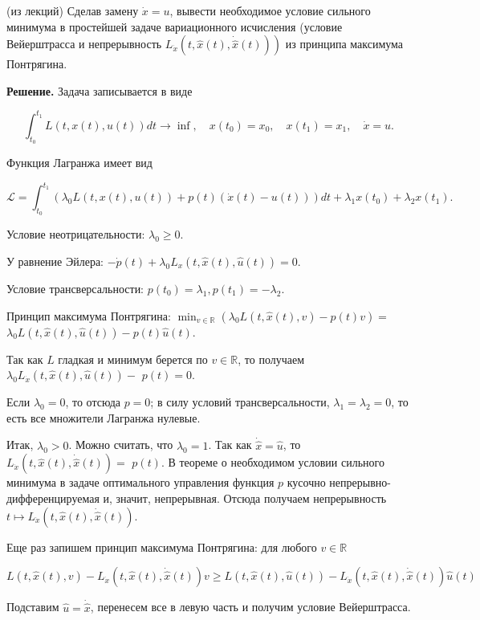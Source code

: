 \begin{task} 
    (из лекций) Сделав замену $\dot{x}=u$, вывести необходимое условие сильного минимума в простейшей задаче 
    вариационного исчисления 
    (условие Вейерштрасса и непрерывность $\left.L_{\dot{x}}(t, \hat{x}(t), \dot{\hat{x}}(t))\right)$ из принципа максимума Понтрягина.

    \textbf{Решение.} Задача записывается в виде
    
    $$
    \int_{t_{0}}^{t_{1}} L(t, x(t), u(t)) d t \rightarrow \inf , \quad x\left(t_{0}\right)=x_{0}, \quad x\left(t_{1}\right)=x_{1}, \quad \dot{x}=u .
    $$
    
    Функция Лагранжа имеет вид
    
    $$
    \mathcal{L}=\int_{t_{0}}^{t_{1}}\left(\lambda_{0} L(t, x(t), u(t))+p(t)(\dot{x}(t)-u(t))\right) d t+\lambda_{1} x\left(t_{0}\right)+\lambda_{2} x\left(t_{1}\right) .
    $$
    
    Условие неотрицательности: $\lambda_{0} \geq 0$.
    
    У равнение Эйлера: $-\dot{p}(t)+\lambda_{0} L_{x}(t, \hat{x}(t), \hat{u}(t))=0$.
    
    Условие трансверсальности: $p\left(t_{0}\right)=\lambda_{1}, p\left(t_{1}\right)=-\lambda_{2}$.
    
    Принцип максимума Понтрягина: $\min _{v \in \mathbb{R}}\left(\lambda_{0} L(t, \hat{x}(t), v)-p(t) v\right)=$ $\lambda_{0} L(t, \hat{x}(t), \hat{u}(t))-p(t) \hat{u}(t)$.
    
    Так как $L$ гладкая и минимум берется по $v \in \mathbb{R}$, то получаем $\lambda_{0} L_{\dot{x}}(t, \hat{x}(t), \hat{u}(t))-$ $p(t)=0$.
    
    Если $\lambda_{0}=0$, то отсюда $p=0$; в силу условий трансверсальности, $\lambda_{1}=\lambda_{2}=0$, то есть все множители Лагранжа нулевые.
    
    Итак, $\lambda_{0}>0$. Можно считать, что $\lambda_{0}=1$. Так как $\dot{\hat{x}}=\hat{u}$, то $L_{\dot{x}}(t, \hat{x}(t), \dot{\hat{x}}(t))=$ $p(t)$. В теореме о необходимом условии сильного минимума в задаче оптимального управления функция $p$ кусочно непрерывно-дифференцируемая и, значит, непрерывная. Отсюда получаем непрерывность $t \mapsto L_{\dot{x}}(t, \hat{x}(t), \dot{\hat{x}}(t))$.
    
    Еще раз запишем принцип максимума Понтрягина: для любого $v \in \mathbb{R}$
    
    $$
    L(t, \hat{x}(t), v)-L_{\dot{x}}(t, \hat{x}(t), \dot{\hat{x}}(t)) v \geq L(t, \hat{x}(t), \hat{u}(t))-L_{\dot{x}}(t, \hat{x}(t), \dot{\hat{x}}(t)) \hat{u}(t)
    $$
    
    Подставим $\hat{u}=\dot{\hat{x}}$, перенесем все в левую часть и получим условие Вейерштрасса.
    
    \end{task}